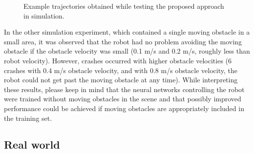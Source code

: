 \begin{figure}
    \centering
    \hfill
    \caption{Example trajectories obtained while testing the proposed approach in simulation.}
    \label{fig:Fig06}
\end{figure}

In the other simulation experiment, which contained a single moving obstacle in a small area, it was observed that the robot had no problem avoiding the moving obstacle if the obstacle velocity was small (0.1 m/s and 0.2 m/s, roughly less than robot velocity). However, crashes occurred with higher obstacle velocities (6 crashes with 0.4 m/s obstacle velocity, and with 0.8 m/s obstacle velocity, the robot could not get past the moving obstacle at any time). While interpreting these results, please keep in mind that the neural networks controlling the robot were trained without moving obstacles in the scene and that possibly improved performance could be achieved if moving obstacles are appropriately included in the training set. 

\subsection{Real world}

